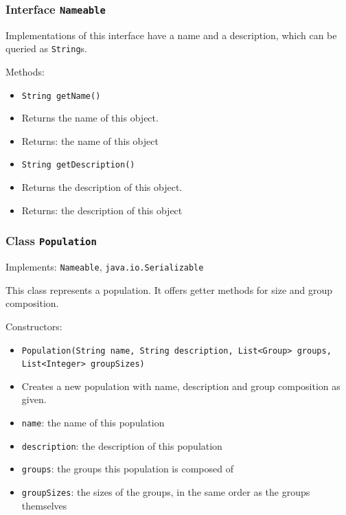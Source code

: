 \documentclass[parskip=full,11pt]{scrartcl}
\begin{document}
\subsubsection{Interface \texttt{Nameable}}

Implementations of this interface have a name and a description, which can be queried as \texttt {String}s.

Methods:
\begin{itemize}\itemsep -10pt
\item \texttt{String getName()}
\item[] Returns the name of this object.
\item[] Returns: the name of this object

\item \texttt{String getDescription()}
\item[] Returns the description of this object.
\item[] Returns: the description of this object
\end{itemize}

\subsubsection{Class \texttt{Population}}
Implements: \texttt{Nameable}, \texttt{java.io.Serializable}

This class represents a population. It offers getter methods for size and group composition.

Constructors:
\begin{itemize}\itemsep -10pt
\item \texttt{Population(String name, String description, List<Group> groups, List<Integer> groupSizes)}
\item[] Creates a new population with name, description and group composition as given.
\item[] \texttt{name}: the name of this population
\item[] \texttt{description}: the description of this population
\item[] \texttt{groups}: the groups this population is composed of
\item[] \texttt{groupSizes}: the sizes of the groups, in the same order as the groups themselves
\end{itemize}
\end{document}
